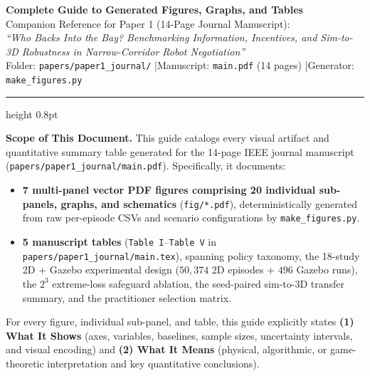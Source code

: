 \documentclass[10pt,a4paper]{article}
\begin{document}
\begin{center}
  {\LARGE\bfseries Complete Guide to Generated Figures, Graphs, and Tables}\\[4pt]
  {\large Companion Reference for Paper 1 (14-Page Journal Manuscript):}\\[2pt]
  {\normalsize\itshape ``Who Backs Into the Bay? Benchmarking Information, Incentives, and Sim-to-3D Robustness in Narrow-Corridor Robot Negotiation''}\\[6pt]
  {\small Folder: \texttt{papers/paper1\_journal/} \quad|\quad Manuscript: \texttt{main.pdf} (14 pages) \quad|\quad Generator: \texttt{make\_figures.py}}
\end{center}
\vspace{2pt}
\hrule height 0.8pt
\vspace{6pt}

\noindent\textbf{Scope of This Document.}
This guide catalogs every visual artifact and quantitative summary table generated for the 14-page IEEE journal manuscript (\texttt{papers/paper1\_journal/main.pdf}). Specifically, it documents:
\begin{itemize}
  \item \textbf{7 multi-panel vector PDF figures comprising 20 individual sub-panels, graphs, and schematics} (\texttt{fig/*.pdf}), deterministically generated from raw per-episode CSVs and scenario configurations by \texttt{make\_figures.py}.
  \item \textbf{5 manuscript tables} (\texttt{Table I}--\texttt{Table V} in \texttt{papers/paper1\_journal/main.tex}), spanning policy taxonomy, the 18-study 2D + Gazebo experimental design ($50{,}374$ 2D episodes + $496$ Gazebo runs), the $2^3$ extreme-loss safeguard ablation, the seed-paired sim-to-3D transfer summary, and the practitioner selection matrix.
\end{itemize}
For every figure, individual sub-panel, and table, this guide explicitly states \textbf{(1) What It Shows} (axes, variables, baselines, sample sizes, uncertainty intervals, and visual encoding) and \textbf{(2) What It Means} (physical, algorithmic, or game-theoretic interpretation and key quantitative conclusions).

\end{document}
